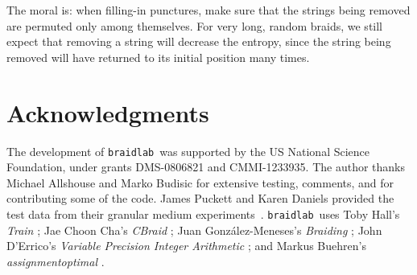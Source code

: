 \documentclass[12pt]{article}
\newcommand{\braidlab}{\texttt{braidlab}}%
\begin{document}
The moral is: when filling-in punctures, make sure that the strings being
removed are permuted only among themselves.  For very long, random braids, we
still expect that removing a string will decrease the entropy, since the
string being removed will have returned to its initial position many times.


\section*{Acknowledgments}

The development of \braidlab\ was supported by the US National Science
Foundation, under grants DMS-0806821 and CMMI-1233935.  The author thanks
Michael Allshouse and Marko Budisic for extensive testing, comments, and for
contributing some of the code.  James Puckett and Karen Daniels provided the
test data from their granular medium experiments~\citep{Puckett2012}.
\braidlab\ uses Toby Hall's \emph{Train} \citep{HallTrain}; Jae Choon Cha's
\emph{CBraid} \citep{CBraid}; Juan Gonz\'{a}lez-Meneses's \emph{Braiding}
\citep{Braiding}; John D'Errico's \emph{Variable Precision Integer Arithmetic}
\citep{vpi}; and Markus Buehren's \emph{assignmentoptimal}
\citep{assignmentoptimal}.





% 
\end{document}
